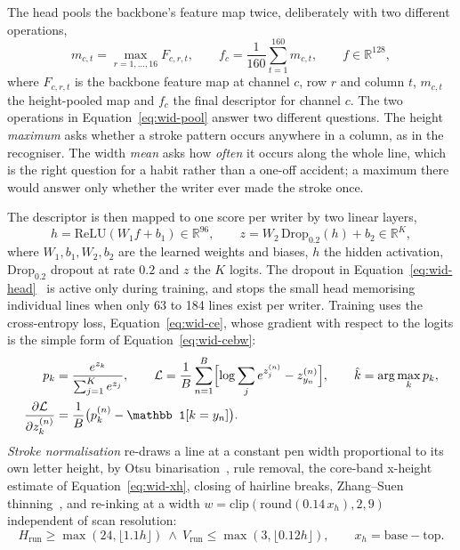 The head pools the backbone's feature map twice, deliberately with two different operations,
\begin{equation}
m_{c,t}=\max_{r=1,\ldots,16}F_{c,r,t},\qquad f_c=\frac1{160}\sum_{t=1}^{160}m_{c,t},\qquad f\in\mathbb R^{128},
\label{eq:wid-pool}
\end{equation}
where $F_{c,r,t}$ is the backbone feature map at channel $c$, row $r$ and column $t$, $m_{c,t}$ the height-pooled map and $f_c$ the final descriptor for channel $c$. The two operations in Equation~\ref{eq:wid-pool} answer two different questions. The height \emph{maximum} asks whether a stroke pattern occurs anywhere in a column, as in the recogniser. The width \emph{mean} asks how \emph{often} it occurs along the whole line, which is the right question for a habit rather than a one-off accident; a maximum there would answer only whether the writer ever made the stroke once.

The descriptor is then mapped to one score per writer by two linear layers,
\begin{equation}
h=\mathrm{ReLU}(W_1f+b_1)\in\mathbb R^{96},\qquad z=W_2\,\mathrm{Drop}_{0.2}(h)+b_2\in\mathbb R^{K},
\label{eq:wid-head}
\end{equation}
where $W_1,b_1,W_2,b_2$ are the learned weights and biases, $h$ the hidden activation, $\mathrm{Drop}_{0.2}$ dropout at rate $0.2$ and $z$ the $K$ logits. The dropout in Equation~\ref{eq:wid-head}~\cite[p.~1930]{srivastava2014} is active only during training, and stops the small head memorising individual lines when only 63 to 184 lines exist per writer. Training uses the cross-entropy loss, Equation~\ref{eq:wid-ce}, whose gradient with respect to the logits is the simple form of Equation~\ref{eq:wid-cebw}:
\begin{align}
p_k&=\frac{e^{z_k}}{\sum_{j=1}^{K}e^{z_j}},\qquad
\mathcal L=\frac1B\sum_{n=1}^B\Bigl[\log\sum_je^{z^{(n)}_j}-z^{(n)}_{y_n}\Bigr],\qquad\hat k=\arg\max_kp_k,\label{eq:wid-ce}\\
\frac{\partial\mathcal L}{\partial z^{(n)}_k}&=\frac{1}{B}\bigl(p^{(n)}_k-\mathbb 1[k=y_n]\bigr).\label{eq:wid-cebw}
\end{align}
\emph{Stroke normalisation} re-draws a line at a constant pen width proportional to its own letter height, by Otsu binarisation~\cite[p.~63]{otsu1979}, rule removal, the core-band x-height estimate of Equation~\ref{eq:wid-xh}, closing of hairline breaks, Zhang--Suen thinning~\cite{zhang1984}, and re-inking at a width $w=\mathrm{clip}(\mathrm{round}(0.14\,x_h),2,9)$ independent of scan resolution:
\begin{equation}
H_{\mathrm{run}}\ge\max(24,\lfloor1.1h\rfloor)\ \wedge\ V_{\mathrm{run}}\le\max(3,\lfloor0.12h\rfloor),\qquad
x_h=\text{base}-\text{top}.
\label{eq:wid-xh}
\end{equation}

